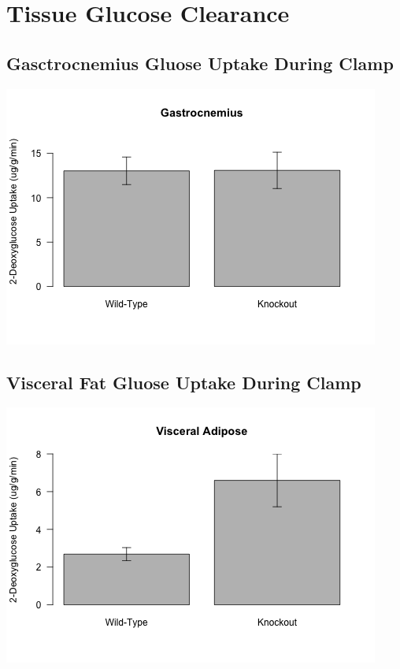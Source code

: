 \documentclass[]{article}
\begin{document}
\section{Tissue Glucose Clearance}\label{tissue-glucose-clearance}

\subsection{Gasctrocnemius Gluose Uptake During
Clamp}\label{gasctrocnemius-gluose-uptake-during-clamp}

\includegraphics{figures/gastroc-1.png}

\subsection{Visceral Fat Gluose Uptake During
Clamp}\label{visceral-fat-gluose-uptake-during-clamp}

\includegraphics{figures/v-fat-1.png}
\end{document}
